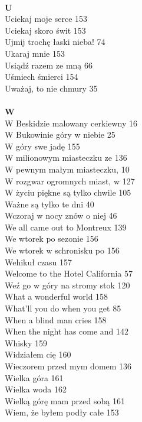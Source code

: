 \documentclass[a5paper, 10pt]{book}
\begin{document}
{\begin{multicols}{3}
    \\
    {\footnotesize \textbf{U\\} }
    Uciekaj moje serce 153\\
    Uciekaj skoro świt 153\\
    Ujmij trochę łaski nieba! 74\\
    Ukaraj mnie 153\\
    Usiądź razem ze mną 66\\
    Uśmiech śmierci 154\\
    Uważaj, to nie chmury 35\\
    \\
    {\footnotesize \textbf{W\\} }
    W Beskidzie malowany cerkiewny 16\\
    W Bukowinie góry w niebie 25\\
    W góry swe jadę 155\\
    W milionowym miasteczku ze 136\\
    W pewnym małym miasteczku, 10\\
    W rozgwar ogromnych miast, w 127\\
    W życiu piękne są tylko chwile 105\\
    Ważne są tylko te dni 40\\
    Wczoraj w nocy znów o niej 46\\
    We all came out to Montreux 139\\
    We wtorek po sezonie 156\\
    We wtorek w schronisku po 156\\
    Wehikuł czasu 157\\
    Welcome to the Hotel California 57\\
    Weź go w góry na stromy stok 120\\
    What a wonderful world 158\\
    What'll you do when you get 85\\
    When a blind man cries 158\\
    When the night has come and 142\\
    Whisky 159\\
    Widziałem cię 160\\
    Wieczorem przed mym domem 136\\
    Wielka góra 161\\
    Wielka woda 162\\
    Wielką górę mam przed sobą 161\\
    Wiem, że byłem podły całe 153\\

\end{multicols}}
\end{document}
